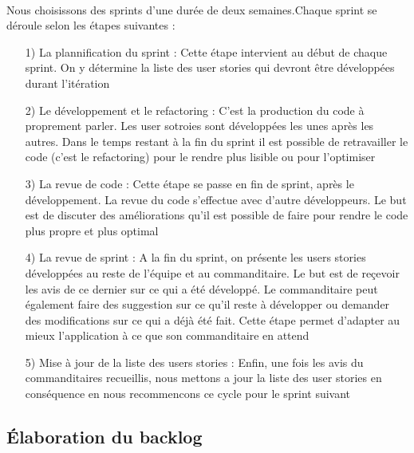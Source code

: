 			\paragraph{}%
			Nous choisissons des sprints d'une durée de deux semaines.Chaque sprint se
			déroule selon les étapes suivantes :
			\begin{itemize}
			  \item[1) La plannification du sprint :] Cette étape intervient au début de
			  chaque sprint. On y détermine la liste des user stories qui devront être
			  développées durant l'itération
			  \item[2) Le développement et le refactoring :] C'est la production du code
			  à proprement parler. Les user sotroies sont développées les unes après les
			  autres. Dans le temps restant à la fin du sprint il est possible de
			  retravailler le code (c'est le refactoring) pour le rendre plus lisible ou
			  pour l'optimiser
			  \item[3) La revue de code :] Cette étape se passe en fin de sprint, après
			  le développement. La revue du code s'effectue avec d'autre développeurs. Le
			  but est de discuter des améliorations qu'il est possible de faire pour
			  rendre le code plus propre et plus optimal
			  \item[4) La revue de sprint :] A la fin du sprint, on présente les users
			  stories développées au reste de l'équipe et au commanditaire. Le but est de
			  reçevoir les avis de ce dernier sur ce qui a été développé. Le
			  commanditaire peut également faire des suggestion sur ce qu'il reste à
			  développer ou demander des modifications sur ce qui a déjà été fait. Cette
			  étape permet d'adapter au mieux l'application à ce que son commanditaire en
			  attend
			  \item[5) Mise à jour de la liste des users stories :] Enfin, une fois les
			  avis du commanditaires recueillis, nous mettons a jour la liste des user
			  stories en conséquence en nous recommencons ce cycle pour le sprint suivant
			\end{itemize}
		
		\subsection{Élaboration du backlog}
